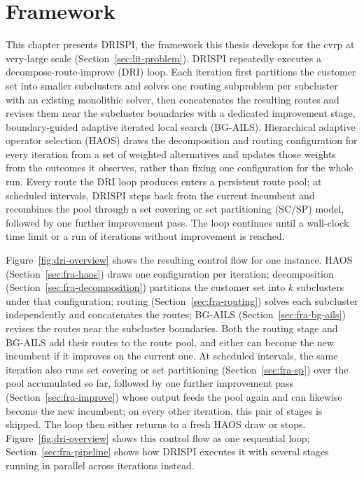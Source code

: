 \chapter{Framework}\label{chapter:framework}

This chapter presents DRISPI, the framework this thesis develops for the \gls{cvrp} at very-large scale (Section~\ref{sec:lit-problem}). DRISPI repeatedly executes a decompose-route-improve (DRI) loop. Each iteration first partitions the customer set into smaller subclusters and solves one routing subproblem per subcluster with an existing monolithic solver, then concatenates the resulting routes and revises them near the subcluster boundaries with a dedicated improvement stage, boundary-guided adaptive iterated local search (BG-AILS). Hierarchical adaptive operator selection (HAOS) draws the decomposition and routing configuration for every iteration from a set of weighted alternatives and updates those weights from the outcomes it observes, rather than fixing one configuration for the whole run. Every route the DRI loop produces enters a persistent route pool; at scheduled intervals, DRISPI steps back from the current incumbent and recombines the pool through a set covering or set partitioning (SC/SP) model, followed by one further improvement pass. The loop continues until a wall-clock time limit or a run of iterations without improvement is reached.

Figure~\ref{fig:dri-overview} shows the resulting control flow for one instance. HAOS (Section~\ref{sec:fra-haos}) draws one configuration per iteration; decomposition (Section~\ref{sec:fra-decomposition}) partitions the customer set into $k$ subclusters under that configuration; routing (Section~\ref{sec:fra-routing}) solves each subcluster independently and concatenates the routes; BG-AILS (Section~\ref{sec:fra-bg-ails}) revises the routes near the subcluster boundaries. Both the routing stage and BG-AILS add their routes to the route pool, and either can become the new incumbent if it improves on the current one. At scheduled intervals, the same iteration also runs set covering or set partitioning (Section~\ref{sec:fra-sp}) over the pool accumulated so far, followed by one further improvement pass (Section~\ref{sec:fra-improve}) whose output feeds the pool again and can likewise become the new incumbent; on every other iteration, this pair of stages is skipped. The loop then either returns to a fresh HAOS draw or stops. Figure~\ref{fig:dri-overview} shows this control flow as one sequential loop; Section~\ref{sec:fra-pipeline} shows how DRISPI executes it with several stages running in parallel across iterations instead.

